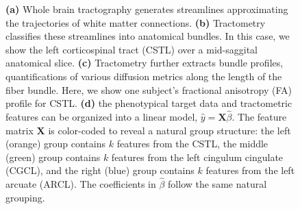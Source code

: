 \documentclass[10pt,%
               aps,%
               prl,%
               preprint,%
               superscriptaddress,%
               preprintnumbers,%
               amsmath,%
               floatfix,%
               endfloats*]{revtex4-1}
\begin{document}
\begin{figure}[!h]
{        \label{fig:methods}
        {\bf (a)} Whole brain tractography generates streamlines approximating
        the trajectories of white matter connections.
        {\bf (b)} Tractometry classifies these streamlines into anatomical bundles.
        In this case, we show the left corticospinal tract (CSTL) over a mid-saggital
        anatomical slice.
        {\bf (c)} Tractometry further extracts bundle profiles,
        quantifications of various diffusion metrics along the length of the
        fiber bundle. Here, we show one subject's fractional anisotropy (FA)
        profile for CSTL.
        {\bf (d)} the phenotypical target data and tractometric features can
        be organized into a linear model, $\hat{y} = \mathbf{X}
        \hat{\beta}$. The feature matrix $\mathbf{X}$ is color-coded
        to reveal a natural group structure: the left (orange) group
        contains $k$ features from the CSTL, the middle (green) group
        contains $k$ features from the left cingulum cingulate (CGCL),
        and the right (blue) group
        contains $k$ features from the left arcuate (ARCL). The coefficients in
        $\hat{\beta}$ follow the same natural grouping.
    }
\end{figure}

\end{document}
